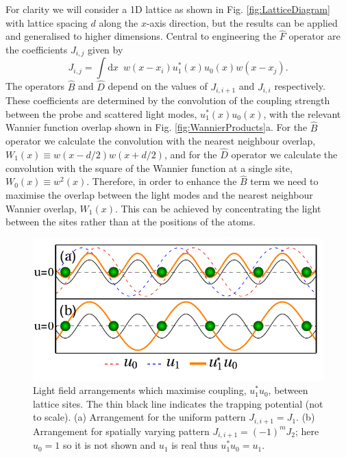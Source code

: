For clarity we will consider a 1D lattice as shown in
Fig. \ref{fig:LatticeDiagram} with lattice spacing $d$ along the
$x$-axis direction, but the results can be applied and generalised to
higher dimensions. Central to engineering the $\hat{F}$ operator are
the coefficients $J_{i,j}$ given by
\begin{equation}
  \label{eq:Jcoeff}
  J_{i,j} = \int \mathrm{d} x \,\,\, w(x - x_i) u_1^*(x) u_0(x) w(x - x_j).
\end{equation}
The operators $\hat{B}$ and $\hat{D}$ depend on the values of
$J_{i,i+1}$ and $J_{i,i}$ respectively. These coefficients are
determined by the convolution of the coupling strength between the
probe and scattered light modes, $u_1^*(x)u_0(x)$, with the relevant
Wannier function overlap shown in Fig. \ref{fig:WannierProducts}a. For
the $\hat{B}$ operator we calculate the convolution with the nearest
neighbour overlap, $W_1(x) \equiv w(x - d/2) w(x + d/2)$, and for the
$\hat{D}$ operator we calculate the convolution with the square of the
Wannier function at a single site, $W_0(x) \equiv w^2(x)$. Therefore,
in order to enhance the $\hat{B}$ term we need to maximise the overlap
between the light modes and the nearest neighbour Wannier overlap,
$W_1(x)$. This can be achieved by concentrating the light between the
sites rather than at the positions of the atoms. 

\begin{figure}[hbtp!]
  \centering
  \includegraphics[width=0.8\linewidth]{BDiagram}
  \caption[Maximising Light-Matter Coupling between Lattice
  Sites]{Light field arrangements which maximise coupling, $u_1^*u_0$,
    between lattice sites. The thin black line indicates the trapping
    potential (not to scale). (a) Arrangement for the uniform pattern
    $J_{i,i+1} = J_1$. (b) Arrangement for spatially varying pattern
    $J_{i,i+1}=(-1)^m J_2$; here $u_0=1$ so it is not shown and $u_1$
    is real thus $u_1^*u_0=u_1$. \label{fig:BDiagram}}
\end{figure}

